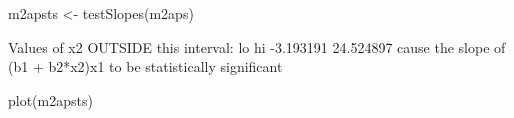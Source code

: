 \begin{Schunk}
\begin{Sinput}
 m2apsts <- testSlopes(m2aps)
\end{Sinput}
\begin{Soutput}
Values of x2 OUTSIDE this interval:
       lo        hi 
-3.193191 24.524897 
cause the slope of (b1 + b2*x2)x1 to be statistically significant
\end{Soutput}
\begin{Sinput}
 plot(m2apsts)
\end{Sinput}
\end{Schunk}
